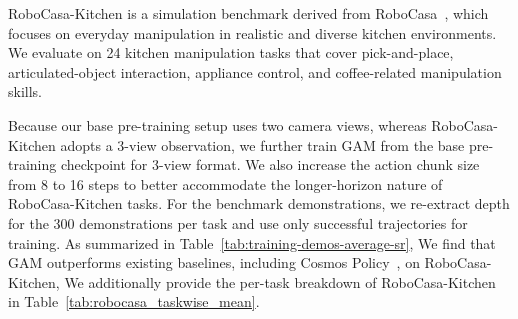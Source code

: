 \documentclass{llmxive}
\providecommand{\arraystretch}{0.98}
\begin{document}
RoboCasa-Kitchen is a simulation benchmark derived from RoboCasa~\cite{nasiriany2024robocasa}, which focuses on everyday manipulation in realistic and diverse kitchen environments. We evaluate on 24 kitchen manipulation tasks that cover pick-and-place, articulated-object interaction, appliance control, and coffee-related manipulation skills.

Because our base pre-training setup uses two camera views, whereas RoboCasa-Kitchen adopts a 3-view observation, we further train GAM from the base pre-training checkpoint for 3-view format. We also increase the action chunk size from 8 to 16 steps to better accommodate the longer-horizon nature of RoboCasa-Kitchen tasks. For the benchmark demonstrations, we re-extract depth for the 300 demonstrations per task and use only successful trajectories for training. As summarized in Table~\ref{tab:training-demos-average-sr}, We find that GAM outperforms existing baselines, including Cosmos Policy~\cite{kim2026cosmos}, on RoboCasa-Kitchen,  We additionally provide the per-task breakdown of RoboCasa-Kitchen in Table~\ref{tab:robocasa_taskwise_mean}.


\begin{table}[t]
    \centering
    \small
    \setlength{\tabcolsep}{5pt}
    \renewcommand{\arraystretch}{1.05}
\caption{
    \textbf{Task-wise success rates on RoboCasa-Kitchen.}
    We report per-task success rates and the overall average.
    }
\label{tab:robocasa_taskwise_mean}
\end{table}
\end{document}
